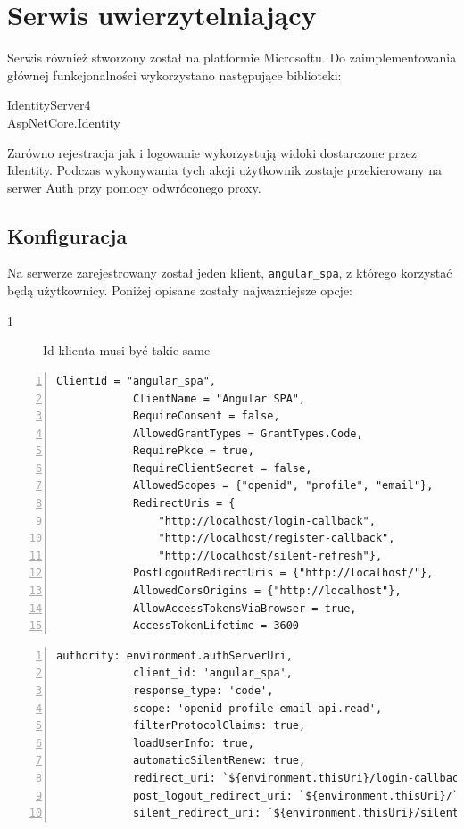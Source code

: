 \section{Serwis uwierzytelniający}
	Serwis również stworzony został na platformie Microsoftu.
	Do zaimplementowania głównej funkcjonalności wykorzystano następujące biblioteki:
	\begin{description}
		\item[IdentityServer4] 
		\item[AspNetCore.Identity] 
	\end{description}

	Zarówno rejestracja jak i logowanie wykorzystują widoki dostarczone przez Identity.
	Podczas wykonywania tych akcji użytkownik zostaje przekierowany na serwer Auth przy pomocy odwróconego proxy.

	\subsection{Konfiguracja}
		Na serwerze zarejestrowany został jeden klient, \verb|angular_spa|, z którego korzystać będą użytkownicy.
		Poniżej opisane zostały najważniejsze opcje:
		\begin{description}
			\item[1] Id klienta musi być takie same
		\end{description}
		\begin{lstlisting}[label=lst:openIdSrv, caption=Konfiguracja OpenId po stronie serwera, numbers=left, numberstyle=\tiny, stepnumber=2, float]
			ClientId = "angular_spa",
			ClientName = "Angular SPA",
			RequireConsent = false,
			AllowedGrantTypes = GrantTypes.Code,
			RequirePkce = true,
			RequireClientSecret = false,
			AllowedScopes = {"openid", "profile", "email"},
			RedirectUris = {
				"http://localhost/login-callback",
				"http://localhost/register-callback",
				"http://localhost/silent-refresh"},
			PostLogoutRedirectUris = {"http://localhost/"},
			AllowedCorsOrigins = {"http://localhost"},
			AllowAccessTokensViaBrowser = true,
			AccessTokenLifetime = 3600
		\end{lstlisting}

		\begin{lstlisting}[label=lst:openIdSpa, caption=Konfiguracja OpenId po stronie Spa, numbers=left, numberstyle=\tiny, stepnumber=2, float]
			authority: environment.authServerUri,
			client_id: 'angular_spa',
			response_type: 'code',
			scope: 'openid profile email api.read',
			filterProtocolClaims: true,
			loadUserInfo: true,
			automaticSilentRenew: true,
			redirect_uri: `${environment.thisUri}/login-callback`,
			post_logout_redirect_uri: `${environment.thisUri}/`,
			silent_redirect_uri: `${environment.thisUri}/silent-refresh`
		\end{lstlisting}
